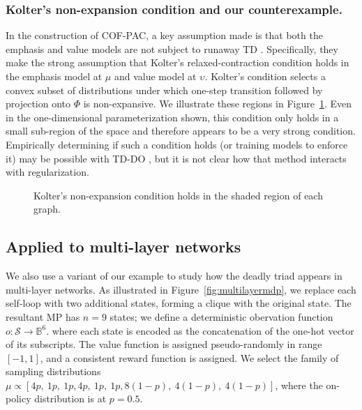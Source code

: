 \subsubsection{Kolter's non-expansion condition and our counterexample. }
In the construction of COF-PAC, a key assumption made is that both the emphasis and value models are not subject to runaway TD \cite[asm.~4]{zhang2020provably}. Specifically, they make the strong assumption that Kolter's relaxed-contraction condition \cite[eqn.~10]{kolter2011fixed} holds in the emphasis model at $\mu$ and value model at $\upsilon$. Kolter's condition selects a convex subset of distributions under which one-step transition followed by projection onto $\Phi$ is non-expansive. We illustrate these regions in Figure~\ref{fig:koldercond}. Even in the one-dimensional parameterization shown, this condition only holds in a small sub-region of the space and therefore appears to be a very strong condition. Empirically determining if such a condition holds (or training models to enforce it) may be possible with TD-DO \cite[sec~4.1]{kolter2011fixed}, but it is not clear how that method interacts with regularization. \label{sec:nosingularity}

\begin{figure}
  \centering
  
  \caption{Kolter's non-expansion condition holds in the shaded region of each graph. }
  \label{fig:koldercond}
\end{figure}


\subsection{Applied to multi-layer networks}
\label{sec:multilayerapp}

We also use a variant of our example to study how the deadly triad appears in multi-layer networks. As illustrated in Figure~\ref{fig:multilayermdp}, we replace each self-loop with two additional states, forming a clique with the original state. The resultant MP has $n=9$ states; we define a deterministic obervation function $o : \mathcal S \to \mathbb B^6$. where each state is encoded as the concatenation of the one-hot vector of its subscripts. The value function is assigned pseudo-randomly in range $[-1, 1]$, and a consistent reward function is assigned.
We select the family of sampling distributions $\mu \propto [4p,~1p,~1p,4p,~1p,~1p,8(1-p),~4(1-p),~4(1-p)]$, where the on-policy distribution is at $p=0.5$.

